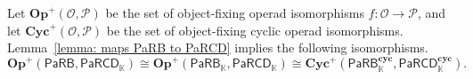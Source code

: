 \documentclass{amsart}
\newcommand{\calO}{\mathcal{O}}
\newcommand{\kk}{\mathbb{K}}    %
\newcommand{\PaRB}{\mathsf{PaRB}}
\newcommand{\PaRCD}{\mathsf{PaRCD}}
\newcommand{\hPaRB}{{\PaRB}_{\kk}}
\newcommand{\hPaRCD}{{\PaRCD}_{\kk}}
\newcommand{\calP}{\mathcal{P}}
\newcommand{\cyc}{\mathbf{cyc}}
\newcommand{\Cyc}{\mathbf{Cyc}}
\newcommand{\Op}{\mathbf{Op}}
\newcommand{\id}{\operatorname{id}}
\newcommand{\ff}{\mathfrak{f}}
\newtheorem{lemma}[theorem]{Lemma}%
\theoremstyle{definition}
\numberwithin{equation}{section}
\begin{document}

Let $\Op^{+}(\calO,\calP)$ be the set of object-fixing operad isomorphisms $f:\calO\to\calP$, and let $\Cyc^{+}(\calO,\calP)$ be the set of object-fixing cyclic operad isomorphisms. Lemma~\ref{lemma: maps PaRB to PaRCD} implies the following isomorphisms. 
\begin{equation}\label{eq: iso between cyc associator and associator}
\Op^{+}(\PaRB, \hPaRCD) \cong  \Op^{+}(\hPaRB, \hPaRCD) \cong \Cyc^{+}(\hPaRB^{\cyc}, \hPaRCD^{\cyc}).
\end{equation}
\end{document}
